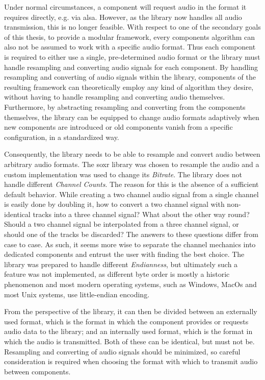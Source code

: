 Under normal circumstances, a component will request audio in the format it requires directly, e.g. via \gls{alsa}.
However, as the library now handles all audio transmission, this is no longer feasible.
With respect to one of the secondary goals of this thesis, to provide a modular framework, every components algorithm can also not be assumed to work with a specific audio format.
Thus each component is required to either use a single, pre-determined audio format or the library must handle resampling and converting audio signals for each component.
By handling resampling and converting of audio signals within the library, components of the resulting framework can theoretically employ any kind of algorithm they desire, without having to handle resampling and converting audio themselves.
Furthermore, by abstracting resampling and converting from the components themselves, the library can be equipped to change audio formats adaptively when new components are introduced or old components vanish from a specific configuration, in a standardized way.

Consequently, the library needs to be able to resample and convert audio between arbitrary audio formats.
The \gls{soxr} library \cite{soxr,soxrbase} was chosen to resample the audio and a custom implementation was used to change its \textit{Bitrate}.
The library does not handle different \textit{Channel Counts}.
The reason for this is the absence of a sufficient default behavior.
While creating a two channel audio signal from a single channel is easily done by doubling it, how to convert a two channel signal with non-identical tracks into a three channel signal?
What about the other way round?
Should a two channel signal be interpolated from a three channel signal, or should one of the tracks be discarded?
The answers to these questions differ from case to case.
As such, it seems more wise to separate the channel mechanics into dedicated components and entrust the user with finding the best choice. 
The library was prepared to handle different \textit{Endianness}, but ultimately such a feature was not implemented, as different byte order is mostly a historic phenomenon and most modern operating systems, such as Windows, MacOs and most Unix systems, use little-endian encoding.

From the perspective of the library, it can then be divided between an externally used format, which is the format in which the component provides or requests audio data to the library; and an internally used format, which is the format in which the audio is transmitted.
Both of these can be identical, but must not be.
Resampling and converting of audio signals should be minimized, so careful consideration is required when choosing the format with which to transmit audio between components.

